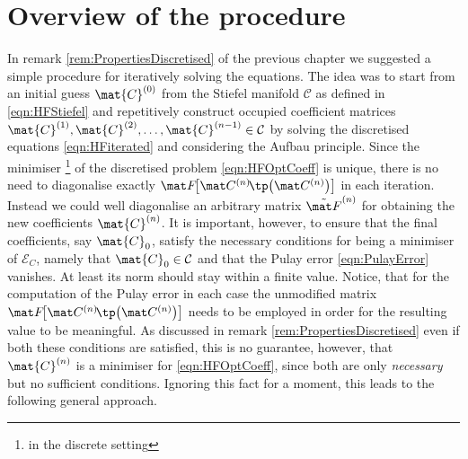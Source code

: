 \section{Overview of the \SCF procedure}
In remark \ref{rem:PropertiesDiscretised}
of the previous chapter
we suggested a simple procedure for iteratively solving the \HF equations.
The idea was to start from an initial guess $\mat{C}^{(0)}$
from the Stiefel manifold $\mathcal{C}$ as defined in \eqref{eqn:HFStiefel}
and repetitively construct occupied coefficient
matrices $\mat{C}^{(1)}, \mat{C}^{(2)}, \ldots, \mat{C}^{(n-1)} \in \mathcal{C}$
by solving the discretised \HF equations \eqref{eqn:HFiterated}
and considering the Aufbau principle.
Since the minimiser%
\footnote{in the discrete setting}
of the discretised \HF problem \eqref{eqn:HFOptCoeff}
is unique, there is no need to diagonalise exactly $\matFnfull$ in each iteration.
Instead we could well diagonalise an arbitrary matrix $\matFnt$
for obtaining the new coefficients $\mat{C}^{(n)}$.
It is important, however, to ensure that the final coefficients,
say $\mat{C}_0$,
satisfy the necessary conditions for being a minimiser of $\mathcal{E}_C$,
namely that $\mat{C}_0 \in \mathcal{C}$ and that the Pulay error \eqref{eqn:PulayError} vanishes.
At least its norm should stay within a finite value.
Notice, that for the computation of the Pulay error
in each case the unmodified matrix $\matFnfull$ needs to be employed
in order for the resulting value to be meaningful.
As discussed in remark \vref{rem:PropertiesDiscretised}
even if both these conditions are satisfied,
this is no guarantee, however,
that $\mat{C}^{(n)}$ is a minimiser for \eqref{eqn:HFOptCoeff},
since both are only \emph{necessary} but no sufficient conditions.
Ignoring this fact for a moment, this leads to the following general approach.

